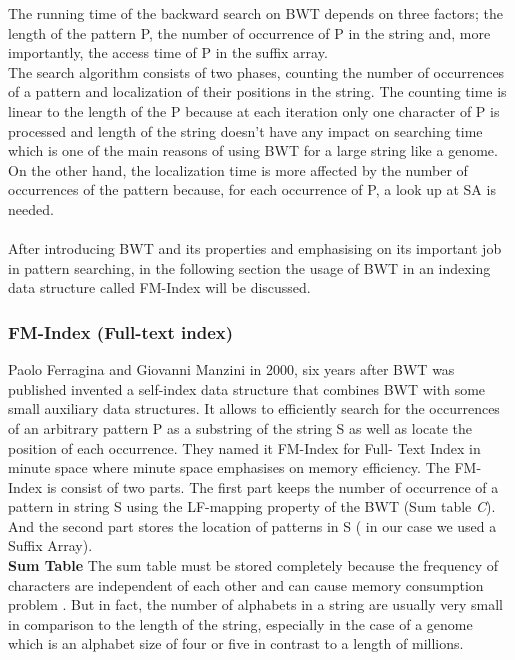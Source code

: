 \documentclass[11pt,a4paper]{report}
\begin{document}
The running time of the backward search on BWT depends on three factors; 
the length of the pattern P, the number of occurrence of P in the string and, 
more importantly, the access time of P in the suffix array.\\
The search algorithm consists of two phases, counting the number of occurrences of
a pattern and localization of their positions in the string.
The counting time is linear to the length of the P because at each iteration 
only one character of P is processed and length of the string doesn't have any 
impact on searching time which is one of the main reasons of using BWT for a large string like a genome.
On the other hand, the localization time is more affected by the number of occurrences 
of the pattern  because, for each occurrence of P, a look up at SA is needed.
\\\\

After introducing BWT and its properties and emphasising on its important job in pattern searching, in the following section the usage of BWT in an indexing data structure called FM-Index will be discussed\cite{fmindex}. 




\subsubsection{FM-Index (Full-text index)}  \label{FM-Index (Full-text index)}

Paolo Ferragina and Giovanni Manzini in 2000, six years after BWT was 
published invented a self-index data structure that combines BWT with some 
small auxiliary data structures. It allows to efficiently search for the 
occurrences of an arbitrary pattern P as a substring of the string S as well 
as locate the position of each occurrence. They named it FM-Index for Full-
Text Index in minute space where minute space emphasises on memory efficiency.
The FM-Index is consist of two parts. The first part keeps the number of
occurrence of a pattern in string S using the LF-mapping property of the BWT (Sum table \emph{C}). 
And the second part stores the location of patterns in S ( in our case we used a Suffix Array)\cite{Wavthesis}.\\

\textbf{Sum Table}  The sum table must be stored completely because the frequency of characters
are independent of each other and can cause memory consumption problem \cite{Wavthesis}.
But in  fact, the number of alphabets in a string are usually very small in comparison to
the length of the string, especially in the case of a genome which is an alphabet size of 
four or five in contrast to a length of millions.
\\
\end{document}
